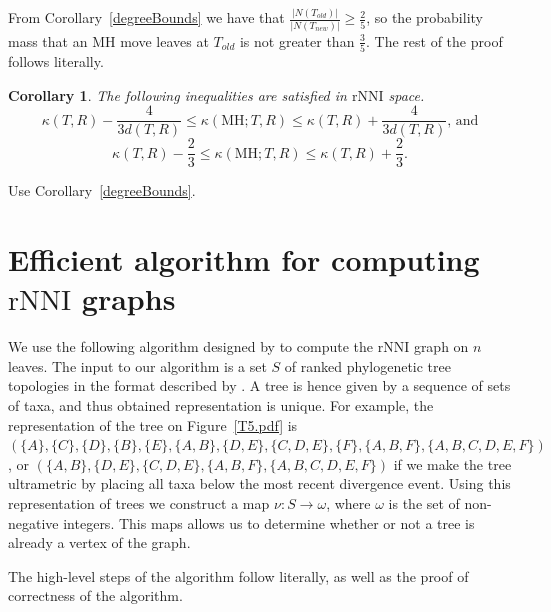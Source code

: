 \documentclass{amsart}
\newtheorem{corollary}[lemma]{Corollary}
\theoremstyle{definition}
\newcommand{\rnni}{\mathrm{rNNI}}
\newcommand{\MH}{\mathrm{MH}}
\begin{document}
\proof
From Corollary~\ref{degreeBounds} we have that $\frac{|N(T_{old})|}{|N(T_{new})|} \geq \frac{2}{5}$, so the probability mass that an MH move leaves at $T_{old}$ is not greater than $\frac35$.
The rest of the proof follows \autocite[][Proof of Lemma~V.8]{Whidden2015-es} literally.
\endproof

\begin{corollary}
The following inequalities are satisfied in $\rnni$  space.
\[
\kappa(T,R) - \dfrac{4}{3d(T,R)} \leq \kappa(\MH;T,R) \leq \kappa(T,R) +
\dfrac{4}{3d(T,R)}\mbox{, and}
\]
\[
\kappa(T,R) - \dfrac23 \leq \kappa(\MH;T,R) \leq \kappa(T,R) + \dfrac23.
\]
\end{corollary}

\proof
Use Corollary~\ref{degreeBounds}.
\endproof


\section{Efficient algorithm for computing $\rnni$ graphs}

We use the following algorithm designed by \textcite{Whidden2015-es} to compute the $\rnni$ graph on $n$ leaves.
The input to our algorithm is a set $S$ of ranked phylogenetic tree topologies in the format described by \textcite{Gavryushkin2014-bw} \autocite[see also][]{Semple2003-nj}.
A tree is hence given by a sequence of sets of taxa, and thus obtained representation is unique.
For example, the representation of the tree on Figure~\ref{T5.pdf} is $(\{A\}, \{C\}, \{D\}, \{B\}, \{E\}, \{A,B\}, \{D,E\}, \{C, D, E\}, \{F\}, \{A,B,F\}, \{A,B,C,D,E,F\})$, or
$(\{A,B\}, \{D,E\}, \{C, D, E\}, \{A,B,F\}, \{A,B,C,D,E,F\})$ if we make the tree ultrametric by placing all taxa below the most recent divergence event.
Using this representation of trees we construct a map $\nu : S \to \omega$, where $\omega$ is the set of non-negative integers.
This maps allows us to determine whether or not a tree is already a vertex of the graph.

The high-level steps of the algorithm follow \textcite{Whidden2015-es} literally, as well as the proof of correctness of the algorithm.
\end{document}

